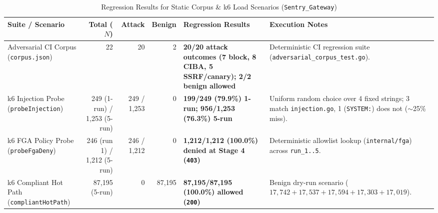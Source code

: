 \documentclass[11pt, a4paper]{article}
\begin{document}
\begin{table}[htbp]
\centering
\caption{Regression Results for Static Corpus \& k6 Load Scenarios (\texttt{Sentry\_Gateway})}
\label{tab:regression-results}
\begin{small}
\begin{tabular}{@{} p{3.4cm} r r r p{3.6cm} p{4.2cm} @{}}
\toprule
\textbf{Suite / Scenario} & \textbf{Total ($N$)} & \textbf{Attack} & \textbf{Benign} & \textbf{Regression Results} & \textbf{Execution Notes} \\
\midrule
Adversarial CI Corpus (\texttt{corpus.json}) & 22 & 20 & 2 & \textbf{20/20 attack outcomes (7 block, 8 CIBA, 5 SSRF/canary); 2/2 benign allowed} & Deterministic CI regression suite (\texttt{adversarial\_corpus\_test.go}). \\
\addlinespace
k6 Injection Probe (\texttt{probeInjection}) & 249 (1-run) / 1,253 (5-run) & 249 / 1,253 & 0 & \textbf{199/249 (79.9\%) 1-run; 956/1,253 (76.3\%) 5-run} & Uniform random choice over 4 fixed strings; 3 match \texttt{injection.go}, 1 (\texttt{SYSTEM:}) does not ($\sim$25\% miss). \\
\addlinespace
k6 FGA Policy Probe (\texttt{probeFgaDeny}) & 246 (run 1) / 1,212 (5-run) & 246 / 1,212 & 0 & \textbf{1,212/1,212 (100.0\%) denied at Stage 4 (\texttt{403})} & Deterministic allowlist lookup (\texttt{internal/fga}) across \texttt{run\_1..5}. \\
\addlinespace
k6 Compliant Hot Path (\texttt{compliantHotPath}) & 87,195 (5-run) & 0 & 87,195 & \textbf{87,195/87,195 (100.0\%) allowed (\texttt{200})} & Benign dry-run scenario ($17{,}742 + 17{,}537 + 17{,}594 + 17{,}303 + 17{,}019$). \\
\bottomrule
\end{tabular}
\end{small}
\end{table}
\end{document}
